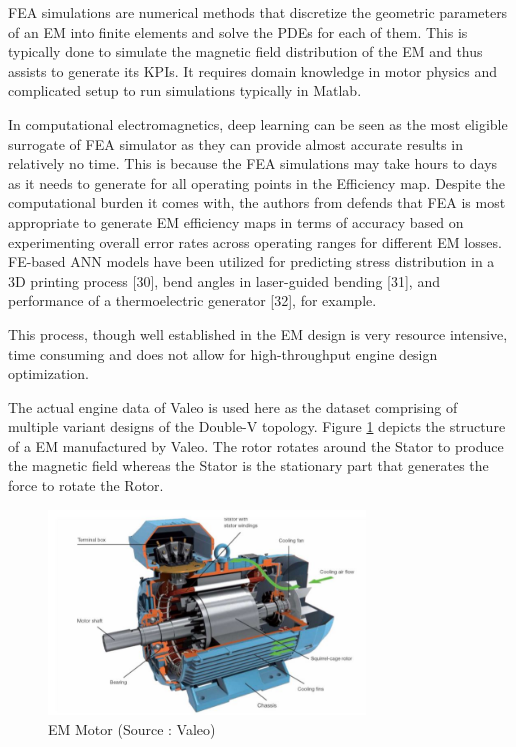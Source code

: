\documentclass{report} %
\begin{document}
\ac{FEA} simulations are numerical methods that discretize the geometric parameters of an \ac{EM} into finite elements and solve the \ac{PDE}s for each of them.
This is typically done to simulate the magnetic field distribution of the \ac{EM} and thus assists to generate its \ac{KPI}s.  
It requires domain knowledge in motor physics and complicated setup to run simulations typically in Matlab.

In computational electromagnetics, deep learning can be seen as the most eligible surrogate of \ac{FEA} simulator as they can
provide almost accurate results in relatively no time. 
This is because the \ac{FEA} simulations may take hours to days as it needs to generate for all operating points in the Efficiency map.
Despite the computational burden it comes with, the authors from \cite{FEA-ETA-2017} defends that \ac{FEA} is most appropriate to 
generate \ac{EM} efficiency maps in terms of accuracy based on experimenting overall error rates across operating ranges for different \ac{EM} losses.
FE-based ANN models have been utilized for predicting stress distribution in a 3D printing process [30], bend angles in laser-guided bending [31], 
and performance of a thermoelectric generator [32], for example.\cite{SM EMT-2020}

This process, though well established in the \ac{EM} design is very resource intensive, time consuming and does not allow for high-throughput engine design optimization. 

The actual engine data of Valeo is used here as the dataset comprising of multiple variant designs of the Double-V topology.
Figure \ref{fig:Valeo Motor Structure} depicts the structure of a \ac{EM} manufactured by Valeo. 
The rotor rotates around the Stator to produce the magnetic field whereas the Stator is the stationary part that generates the force to rotate the Rotor.         
\begin{figure}[H]
    \centering
    \includegraphics[width=0.75\textwidth]{./ReportImages/ValeoMotorStructure.jpg} 
    \caption{\ac{EM} Motor (Source : Valeo)}
    \label{fig:Valeo Motor Structure}
\end{figure}
\end{document}
